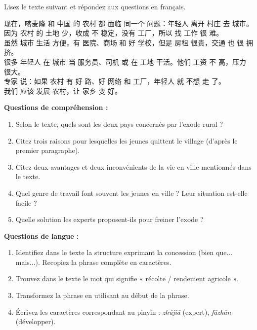 \documentclass[11pt]{article}
\newcommand{\zh}[1]{\ifmmode\text{#1}\else{#1}\fi}
\begin{document}
\begin{exercice}
Lisez le texte suivant et répondez aux questions en français.

\begin{textebox}
现在，喀麦隆 和 中国 的 农村 都 面临 同一个 问题：年轻人 离开 村庄 去 城市。\\
因为 农村 的 土地 少，收成 不 稳定，没有 工厂，所以 找 工作 很 难。\\
虽然 城市 生活 方便，有 医院、商场 和 好 学校，但是 房租 很贵，交通 也 很 拥挤。\\
很多 年轻人 在 城市 当 服务员、司机 或 在 工地 干活。他们 工资 不 高，压力 很大。\\
专家 说：如果 农村 有 好 路、好 网络 和 工厂，年轻人 就 不想 走 了。\\
我们 应该 发展 农村，让 家乡 变 好。
\end{textebox}

\textbf{Questions de compréhension :}
\begin{enumerate}
\item Selon le texte, quels sont les deux pays concernés par l'exode rural ?
\item Citez trois raisons pour lesquelles les jeunes quittent le village (d'après le premier paragraphe).
\item Citez deux avantages et deux inconvénients de la vie en ville mentionnés dans le texte.
\item Quel genre de travail font souvent les jeunes en ville ? Leur situation est-elle facile ?
\item Quelle solution les experts proposent-ils pour freiner l'exode ?
\end{enumerate}

\textbf{Questions de langue :}
\begin{enumerate}
\item Identifiez dans le texte la structure exprimant la concession (bien que... mais...). Recopiez la phrase complète en caractères.
\item Trouvez dans le texte le mot qui signifie « récolte / rendement agricole ».
\item Transformez la phrase \zh{年轻人 离开 村庄} en utilisant \zh{越来越多} au début de la phrase.
\item Écrivez les caractères correspondant au pinyin : \emph{zhǔjiā} (expert), \emph{fāzhǎn} (développer).
\end{enumerate}
\end{exercice}
\end{document}
